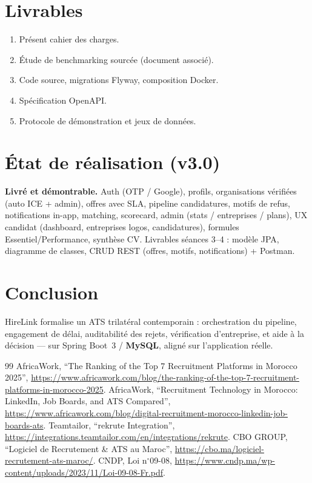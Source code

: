 \documentclass[12pt,a4paper,oneside]{report}
\begin{document}
\chapter{Livrables}
\begin{enumerate}[leftmargin=1.4em]
  \item Présent cahier des charges.
  \item Étude de benchmarking sourcée (document associé).
  \item Code source, migrations Flyway, composition Docker.
  \item Spécification OpenAPI.
  \item Protocole de démonstration et jeux de données.
\end{enumerate}

\chapter{État de réalisation (v3.0)}
\label{ch:etat}
\begin{objectifbox}
\textbf{Livré et démontrable.} Auth (OTP / Google), profils, organisations vérifiées (auto ICE + admin), offres avec SLA, pipeline candidatures, motifs de refus, notifications in-app, matching, scorecard, admin (stats / entreprises / plans), UX candidat (dashboard, entreprises logos, candidatures), formules Essentiel/Performance, synthèse CV. Livrables séances 3--4 : modèle JPA, diagramme de classes, CRUD REST (offres, motifs, notifications) + Postman.
\end{objectifbox}

\chapter{Conclusion}
HireLink formalise un ATS trilatéral contemporain : orchestration du pipeline, engagement de délai, auditabilité des rejets, vérification d'entreprise, et aide à la décision --- sur Spring Boot~3 / \textbf{MySQL}, aligné sur l'application réelle.

\begin{thebibliography}{99}
 AfricaWork, ``The Ranking of the Top 7 Recruitment Platforms in Morocco 2025'', \url{https://www.africawork.com/blog/the-ranking-of-the-top-7-recruitment-platforms-in-morocco-2025}.
 AfricaWork, ``Recruitment Technology in Morocco: LinkedIn, Job Boards, and ATS Compared'', \url{https://www.africawork.com/blog/digital-recruitment-morocco-linkedin-job-boards-ats}.
 Teamtailor, ``rekrute Integration'', \url{https://integrations.teamtailor.com/en/integrations/rekrute}.
 CBO GROUP, ``Logiciel de Recrutement \& ATS au Maroc'', \url{https://cbo.ma/logiciel-recrutement-ats-maroc/}.
 CNDP, Loi n$^\circ$09-08, \url{https://www.cndp.ma/wp-content/uploads/2023/11/Loi-09-08-Fr.pdf}.
\end{thebibliography}
\end{document}
